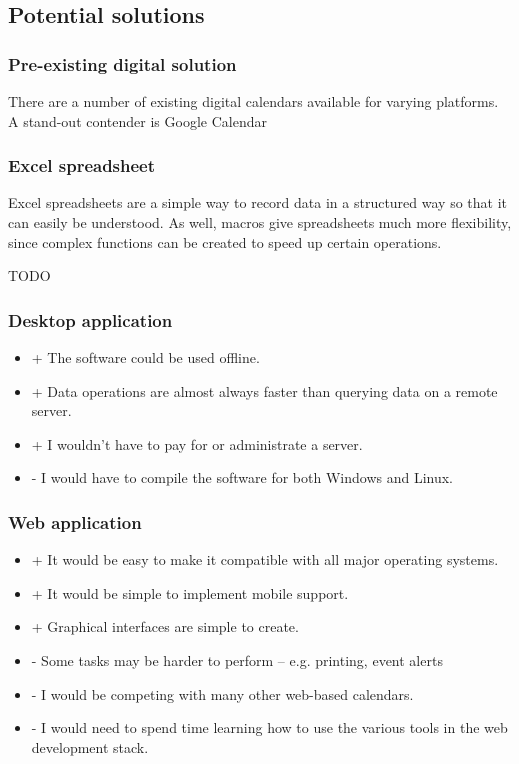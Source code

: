 \subsection{Potential solutions}


\subsubsection{Pre-existing digital solution}

There are a number of existing digital calendars available for varying
platforms. A stand-out contender is Google Calendar

\subsubsection{Excel spreadsheet}

Excel spreadsheets are a simple way to record data in a structured way so that
it can easily be understood. As well, macros give spreadsheets much more
flexibility, since complex functions can be created to speed up certain
operations.

TODO

\subsubsection{Desktop application}

\begin{itemize}
  \item + The software could be used offline.
  \item + Data operations are almost always faster than querying data on a
          remote server.
  \item + I wouldn't have to pay for or administrate a server.
  \item - I would have to compile the software for both Windows and Linux.
\end{itemize}



\subsubsection{Web application}

\begin{itemize}
  \item + It would be easy to make it compatible with all major operating
          systems.
  \item + It would be simple to implement mobile support.
  \item + Graphical interfaces are simple to create.
  \item - Some tasks may be harder to perform -- e.g. printing, event alerts
  \item - I would be competing with many other web-based calendars.
  \item - I would need to spend time learning how to use the various tools in
          the web development stack.
\end{itemize}

